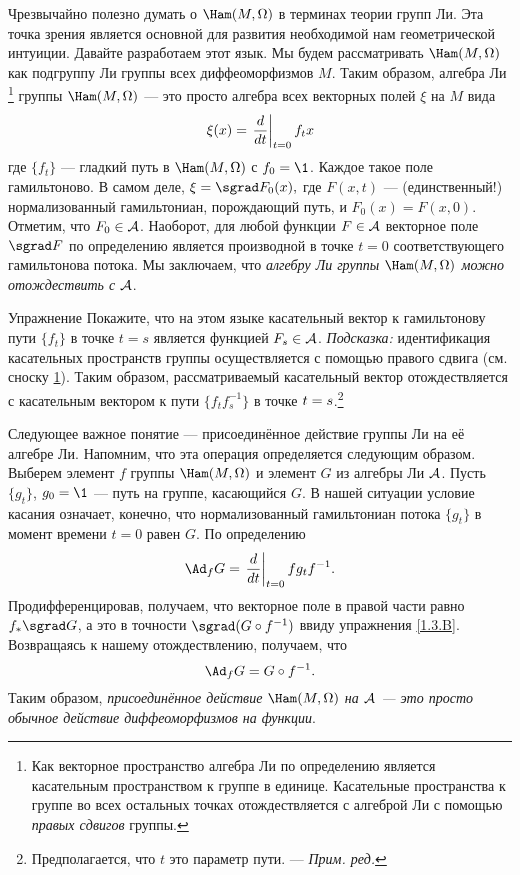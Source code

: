 Чрезвычайно полезно думать о $\Ham (M, \Omega)$ в терминах теории групп Ли.
Эта точка зрения является основной для развития необходимой нам геометрической интуиции.
Давайте разработаем этот язык.
Мы будем рассматривать $\Ham (M, \Omega)$ как подгруппу Ли группы всех диффеоморфизмов $M$.
Таким образом, алгебра Ли%
\footnote{\label{footnote} Как векторное пространство алгебра Ли по определению является касательным пространством к
группе в единице.
Касательные пространства к группе во всех остальных точках 
отождествляется с алгеброй Ли с помощью {}\emph{правых сдвигов} группы.}
группы $\Ham (M, \Omega)$ — это просто алгебра всех векторных полей $\xi$ на $M$ вида 
\[\xi(x)=\left.\frac{d}{d t}\right|_{t=0}f_tx\]
где $\{f_t\}$ — гладкий путь в $\Ham (M, \Omega)$ с $f_0 = \1$.
Каждое такое поле гамильтоново.
В самом деле, $\xi = \sgrad F_0 (x),$ где $F (x, t)$ — (единственный!) нормализованный гамильтониан, порождающий путь, и $F_0 (x) = F (x, 0)$.
Отметим, что $F_0 \in \mathcal{A}$.
Наоборот, для любой функции $F \in \mathcal{A}$ векторное поле $\sgrad F$ по определению является производной в точке $t = 0$ соответствующего гамильтонова потока.
Мы заключаем, что \emph{алгебру Ли группы $\Ham (M, \Omega)$ можно отождествить с $\mathcal{A}$}.

\begin{ex}{Упражнение}\label{1.4.G}
Покажите, что на этом языке касательный вектор к гамильтонову пути $\{f_t\}$ в точке $t = s$ является функцией $F_s \in \mathcal{A}$.
\emph{Подсказка:} идентификация касательных пространств группы осуществляется с помощью правого сдвига (см. сноску \ref{footnote}).
Таким образом, рассматриваемый касательный вектор отождествляется с
касательным вектором к пути $\{f_tf_s^{-1}\}$ в точке $t \z= s$.\footnote{Предполагается, что $t$ это параметр пути. — \textit{Прим. ред.}}
\end{ex}

Следующее важное понятие — присоединённое действие группы Ли на её алгебре Ли.
Напомним, что эта операция определяется следующим образом.
Выберем элемент $f$ группы $\Ham (M, \Omega)$ и элемент $G$ из алгебры Ли $\mathcal{A}$.
Пусть $\{g_t\}$, $g_0 = \1$ — путь на группе, касающийся $G$.
В нашей ситуации условие касания означает, конечно, что нормализованный гамильтониан потока $\{g_t\}$ в момент времени $t = 0$ равен $G$.
По определению 
\[\Ad_f G = \left.\frac{\d}{\d t}\right|_{t=0} fg_tf^{-1}.\]
Продифференцировав, получаем, что векторное поле в правой части равно $f_\ast \sgrad G$, а это в точности $\sgrad  (G\circ f^{-1})$ ввиду упражнения \ref{1.3.B}.
Возвращаясь к нашему отождествлению, получаем, что 
\[\Ad_f G = G \circ f^{-1}.\]
Таким образом, \emph{присоединённое действие $\Ham (M, \Omega)$ на $\mathcal{A}$ — это просто обычное действие диффеоморфизмов на функции}.

